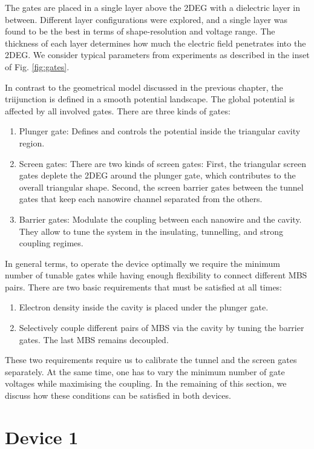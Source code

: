 The gates are placed in a single layer above the 2DEG with a dielectric layer in between.
Different layer configurations were explored, and a single layer was found to be the best in terms of shape-resolution and voltage range.
The thickness of each layer determines how much the electric field penetrates into the 2DEG.
We consider typical parameters from experiments as described in the inset of Fig. \ref{fig:gates}.

In contrast to the geometrical model discussed in the previous chapter, the triijunction is defined in a smooth potential landscape.
The global potential is affected by all involved gates.
There are three kinds of gates:
\begin{enumerate}
\item Plunger gate: Defines and controls the potential inside the triangular cavity region.
\item Screen gates: There are two kinds of screen gates: First, the triangular screen gates deplete the 2DEG around the plunger gate, which contributes to the overall triangular shape. Second, the screen barrier gates between the tunnel gates that keep each nanowire channel separated from the others.
\item Barrier gates: Modulate the coupling between each nanowire and the cavity. They allow to tune the system in the insulating, tunnelling, and strong coupling regimes.
\end{enumerate}

In general terms, to operate the device optimally we require the minimum number of tunable gates while having enough flexibility to connect different MBS pairs.
There are two basic requirements that must be satisfied at all times:
\begin{enumerate}
\item Electron density inside the cavity is placed under the plunger gate.
\item Selectively couple different pairs of MBS via the cavity by tuning the barrier gates. The last MBS remains decoupled.
\end{enumerate}
These two requirements require us to calibrate the tunnel and the screen gates separately.
At the same time, one has to vary the minimum number of gate voltages while maximising the coupling.
In the remaining of this section, we discuss how these conditions can be satisfied in both devices.

\section{Device 1}

